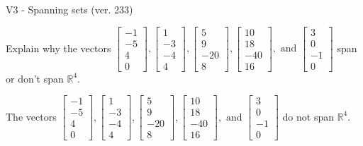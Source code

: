 \begin{exercise}
  \begin{exerciseTitle}V3 - Spanning sets (ver. 233)\end{exerciseTitle}
  \begin{exerciseStatement}
    Explain why the vectors \(\left[\begin{array}{r}
-1 \\
-5 \\
4 \\
0
\end{array}\right] , \left[\begin{array}{r}
1 \\
-3 \\
-4 \\
4
\end{array}\right] , \left[\begin{array}{r}
5 \\
9 \\
-20 \\
8
\end{array}\right] , \left[\begin{array}{r}
10 \\
18 \\
-40 \\
16
\end{array}\right] , \text{ and } \left[\begin{array}{r}
3 \\
0 \\
-1 \\
0
\end{array}\right]\) span or don't span \(\mathbb{R}^4\). 
	


  \end{exerciseStatement}
  \begin{exerciseAnswer}
   The vectors \(\left[\begin{array}{r}
-1 \\
-5 \\
4 \\
0
\end{array}\right] , \left[\begin{array}{r}
1 \\
-3 \\
-4 \\
4
\end{array}\right] , \left[\begin{array}{r}
5 \\
9 \\
-20 \\
8
\end{array}\right] , \left[\begin{array}{r}
10 \\
18 \\
-40 \\
16
\end{array}\right] , \text{ and } \left[\begin{array}{r}
3 \\
0 \\
-1 \\
0
\end{array}\right]\) 
  	 do not  
	span \(\mathbb{R}^4\).
  



\end{exerciseAnswer}
\end{exercise}
